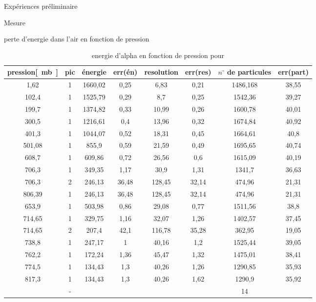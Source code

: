 \documentclass[a4paper,11pt]{scrartcl}
\begin{document}
\begin{section}{Expériences préliminaire}
\begin{section}{Mesure}
 \end{section}
\begin{subsection}{perte d'energie dans l'air en fonction de pression}
\begin{table}[htbp]
\caption{energie d'alpha en fonction de pression pour }
\begin{center}
\begin{tabular}{|c||c|c|c|c|c|c|c|}
\hline 
pression\unit{[mb]} & pic	&	énergie	&	err(én)	&	resolution	&	err(res)	&	$n^{\circ}$ de particules	&	err(part) 	\\ \hline\hline
1,62	&	1	&	1660,02	&	0,25	&	6,83	&	0,21	&	1486,168	&	38,55	\\ \hline
102,4	&	1	&	1525,79	&	0,29	&	8,7	&	0,25	&	1542,36	&	39,27	\\ \hline
199,7	&	1	&	1374,82	&	0,33	&	10,99	&	0,26	&	1600,78	&	40,01	\\ \hline
300,5	&	1	&	1216,61	&	0,4	&	13,96	&	0,32	&	1674,84	&	40,92	\\ \hline
401,3	&	1	&	1044,07	&	0,52	&	18,31	&	0,45	&	1664,61	&	40,8	\\ \hline
501,08	&	1	&	855,9	&	0,59	&	21,59	&	0,49	&	1695,65	&	40,74	\\ \hline
608,7	&	1	&	609,86	&	0,72	&	26,56	&	0,6	&	1615,09	&	40,19	\\ \hline
706,3	&	1	&	349,35	&	1,17	&	30,9	&	1,31	&	1341,7	&	36,63	\\ \hline
706,3	&	2	&	246,13	&	36,48	&	128,45	&	32,14	&	474,96	&	21,31	\\ \hline
806,39	&	1	&	246,13	&	36,48	&	128,45	&	32,14	&	474,96	&	21,31	\\ \hline
653,9	&	1	&	503,98	&	0,86	&	29,08	&	0,77	&	1511,56	&	38,8	\\ \hline
714,65	&	1	&	329,75	&	1,16	&	32,07	&	1,26	&	1402,57	&	37,45	\\ \hline
714,65	&	2	&	207,4	&	42,1	&	116,78	&	35,28	&	362,95	&	19,05	\\ \hline
738,8	&	1	&	247,17	&	1	&	40,16	&	1,2	&	1525,44	&	39,05	\\ \hline
762,2	&	1	&	172,24	&	1,36	&	45,47	&	1,32	&	1475,01	&	38,41	\\ \hline
774,5	&	1	&	134,43	&	1,3	&	40,26	&	1,26	&	1290,85	&	35,93	\\ \hline
817,3	&	1	&	134,43	&	1,3	&	40,26	&	1,62	&	1290,9	&	35,92	\\ \hline
	&	-	&		&		&		&		&	14	&		\\ \hline\hline


\end{tabular}
\end{center}
\end{table}
\end{subsection}
\end{section}
\end{document}
